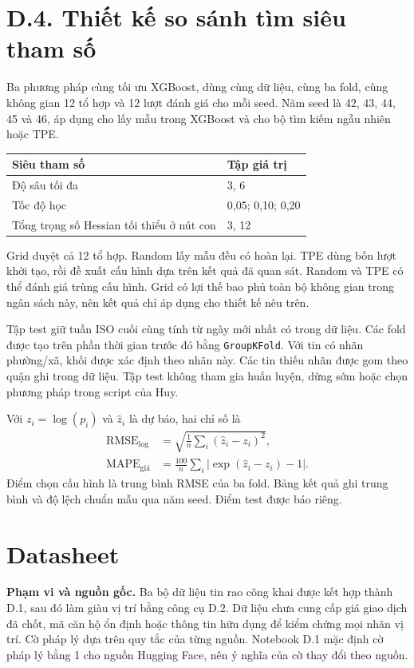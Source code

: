 \documentclass[11pt,a4paper]{article}
\begin{document}
\section{D.4. Thiết kế so sánh tìm siêu tham số}
Ba phương pháp cùng tối ưu XGBoost, dùng cùng dữ liệu, cùng ba fold, cùng không gian 12 tổ hợp và 12 lượt đánh giá cho mỗi seed. Năm seed là 42, 43, 44, 45 và 46, áp dụng cho lấy mẫu trong XGBoost và cho bộ tìm kiếm ngẫu nhiên hoặc TPE.
\begin{center}
\begin{tabular}{ll}
\toprule
Siêu tham số & Tập giá trị\\
\midrule
Độ sâu tối đa & 3, 6\\
Tốc độ học & 0,05; 0,10; 0,20\\
Tổng trọng số Hessian tối thiểu ở nút con & 3, 12\\
\bottomrule
\end{tabular}
\end{center}
Grid duyệt cả 12 tổ hợp. Random lấy mẫu đều có hoàn lại. TPE dùng bốn lượt khởi tạo, rồi đề xuất cấu hình dựa trên kết quả đã quan sát. Random và TPE có thể đánh giá trùng cấu hình. Grid có lợi thế bao phủ toàn bộ không gian trong ngân sách này, nên kết quả chỉ áp dụng cho thiết kế nêu trên.

Tập test giữ tuần ISO cuối cùng tính từ ngày mới nhất có trong dữ liệu. Các fold được tạo trên phần thời gian trước đó bằng \texttt{GroupKFold}. Với tin có nhãn phường/xã, khối được xác định theo nhãn này. Các tin thiếu nhãn được gom theo quận ghi trong dữ liệu. Tập test không tham gia huấn luyện, dừng sớm hoặc chọn phương pháp trong script của Huy.

Với $z_i=\log(p_i)$ và $\hat z_i$ là dự báo, hai chỉ số là
\begin{align*}
\mathrm{RMSE}_{\log} &= \sqrt{\frac{1}{n}\sum_i(\hat z_i-z_i)^2},\\
\mathrm{MAPE}_{\mathrm{giá}} &= \frac{100}{n}\sum_i|\exp(\hat z_i-z_i)-1|.
\end{align*}
Điểm chọn cấu hình là trung bình RMSE của ba fold. Bảng kết quả ghi trung bình và độ lệch chuẩn mẫu qua năm seed. Điểm test được báo riêng.



\section{Datasheet}
\textbf{Phạm vi và nguồn gốc.} Ba bộ dữ liệu tin rao công khai được kết hợp thành D.1, sau đó làm giàu vị trí bằng công cụ D.2. Dữ liệu chưa cung cấp giá giao dịch đã chốt, mã căn hộ ổn định hoặc thông tin hữu dụng để kiểm chứng mọi nhãn vị trí. Cờ pháp lý dựa trên quy tắc của từng nguồn. Notebook D.1 mặc định cờ pháp lý bằng 1 cho nguồn Hugging Face, nên ý nghĩa của cờ thay đổi theo nguồn.
\end{document}
